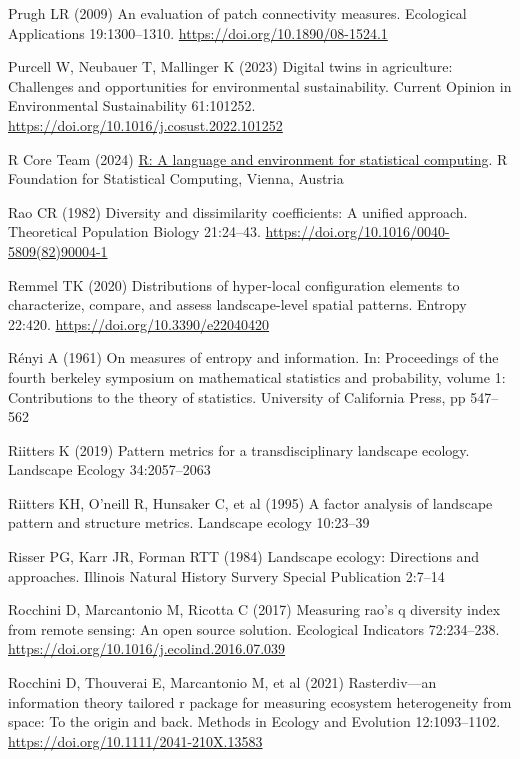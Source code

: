 \documentclass[
  10pt,
  a4paperpaper,
]{article}
\newlength{\cslhangindent}
\newenvironment{CSLReferences}[2] %
 {\begin{list}{}{%
  \setlength{\itemindent}{0pt}
  \setlength{\leftmargin}{0pt}
  \setlength{\parsep}{0pt}
  \ifodd #1
   \setlength{\leftmargin}{\cslhangindent}
   \setlength{\itemindent}{-1\cslhangindent}
  \fi
  \setlength{\itemsep}{#2\baselineskip}}}
 {\end{list}}
\begin{document}
\begin{CSLReferences}{1}{1}
Prugh LR (2009) An evaluation of patch connectivity measures. Ecological
Applications 19:1300--1310. \url{https://doi.org/10.1890/08-1524.1}

Purcell W, Neubauer T, Mallinger K (2023) Digital twins in agriculture:
Challenges and opportunities for environmental sustainability. Current
Opinion in Environmental Sustainability 61:101252.
\url{https://doi.org/10.1016/j.cosust.2022.101252}

R Core Team (2024) \href{https://www.R-project.org/}{R: A language and
environment for statistical computing}. R Foundation for Statistical
Computing, Vienna, Austria

Rao CR (1982) Diversity and dissimilarity coefficients: A unified
approach. Theoretical Population Biology 21:24--43.
\url{https://doi.org/10.1016/0040-5809(82)90004-1}

Remmel TK (2020) Distributions of hyper-local configuration elements to
characterize, compare, and assess landscape-level spatial patterns.
Entropy 22:420. \url{https://doi.org/10.3390/e22040420}

Rényi A (1961) On measures of entropy and information. In: Proceedings
of the fourth berkeley symposium on mathematical statistics and
probability, volume 1: Contributions to the theory of statistics.
University of California Press, pp 547--562

Riitters K (2019) Pattern metrics for a transdisciplinary landscape
ecology. Landscape Ecology 34:2057--2063

Riitters KH, O'neill R, Hunsaker C, et al (1995) A factor analysis of
landscape pattern and structure metrics. Landscape ecology 10:23--39

Risser PG, Karr JR, Forman RTT (1984) Landscape ecology: Directions and
approaches. Illinois Natural History Survery Special Publication 2:7--14

Rocchini D, Marcantonio M, Ricotta C (2017) Measuring rao's q diversity
index from remote sensing: An open source solution. Ecological
Indicators 72:234--238.
\url{https://doi.org/10.1016/j.ecolind.2016.07.039}

Rocchini D, Thouverai E, Marcantonio M, et al (2021) Rasterdiv---an
information theory tailored r package for measuring ecosystem
heterogeneity from space: To the origin and back. Methods in Ecology and
Evolution 12:1093--1102. \url{https://doi.org/10.1111/2041-210X.13583}


\end{CSLReferences}
\end{document}
